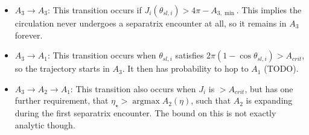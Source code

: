 \documentclass[11pt,
        usenames, %
        dvipsnames %
    ]{article}
\newcommand*{\p}[1]{\left(#1\right)}
\DeclareMathOperator*{\argmax}{argmax}
\begin{document}
\begin{itemize}
    \item $A_3 \to A_3$: This transition occurs if $J_i(\theta_{sl, i}) > 4\pi -
        A_{3, \min}$. This implies the circulation never undergoes a separatrix
        encounter at all, so it remains in $A_3$ forever.

    \item $A_3 \to A_1$: This transition occurs when $\theta_{sl, i}$ satisfies
        $2\pi\p{1 - \cos \theta_{sl, i}} > A_{crit}$, so the trajectory starts
        in $A_3$. It then has probability to hop to $A_1$ (TODO).

    \item $A_3 \to A_2 \to A_1$: This transition also occurs when $J_i$ is
        $> A_{crit}$, but has one further requirement, that $\eta_{\star} >
        \argmax A_2(\eta)$, such that $A_2$ is expanding during the first
        separatrix encounter. The bound on this is not exactly analytic though.
\end{itemize}
\end{document}
